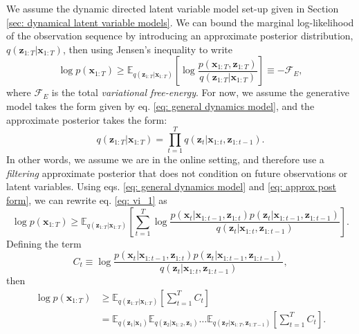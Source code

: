 We assume the dynamic directed latent variable model set-up given in Section \ref{sec: dynamical latent variable models}. We can bound the marginal log-likelihood of the observation sequence by introducing an approximate posterior distribution, $q(\mathbf{z}_{1:T} | \mathbf{x}_{1:T})$, then using Jensen's inequality to write
\begin{equation}
    \log p(\mathbf{x}_{1:T}) \geq \mathbb{E}_{q(\mathbf{z}_{1:T} | \mathbf{x}_{1:T})} \left[ \log \frac{p(\mathbf{x}_{1:T} , \mathbf{z}_{1:T})}{q(\mathbf{z}_{1:T} | \mathbf{x}_{1:T})} \right] \equiv - \mathcal{F}_E,
    \label{eq: vi_1}
\end{equation}
where $\mathcal{F}_E$ is the total \textit{variational free-energy}. For now, we assume the generative model takes the form given by eq. \ref{eq: general dynamics model}, and the approximate posterior takes the form:
\begin{equation}
    q(\mathbf{z}_{1:T} | \mathbf{x}_{1:T}) = \prod_{t=1}^T q(\mathbf{z}_t | \mathbf{x}_{1:t} , \mathbf{z}_{1:t-1}).
    \label{eq: approx post form}
\end{equation}
In other words, we assume we are in the online setting, and therefore use a \textit{filtering} approximate posterior that does not condition on future observations or latent variables. Using eqs. \ref{eq: general dynamics model} and \ref{eq: approx post form}, we can rewrite eq. \ref{eq: vi_1} as
\begin{equation}
    \log p(\mathbf{x}_{1:T}) \geq \mathbb{E}_{q(\mathbf{z}_{1:T} | \mathbf{x}_{1:T})} \left[ \sum_{t=1}^T \log \frac{p(\mathbf{x}_t | \mathbf{x}_{1:t-1} , \mathbf{z}_{1:t}) p(\mathbf{z}_t | \mathbf{x}_{1:t-1} , \mathbf{z}_{1:t-1})}{q(\mathbf{z}_t | \mathbf{x}_{1:t} , \mathbf{z}_{1:t-1})} \right].
\end{equation}
Defining the term
\begin{equation}
    C_t \equiv \log \frac{p(\mathbf{x}_t | \mathbf{x}_{1:t-1} , \mathbf{z}_{1:t}) p(\mathbf{z}_t | \mathbf{x}_{1:t-1} , \mathbf{z}_{1:t-1})}{q(\mathbf{z}_t | \mathbf{x}_{1:t} , \mathbf{z}_{1:t-1})},
\end{equation}
then
\begin{align}
    \log p(\mathbf{x}_{1:T}) & \geq \mathbb{E}_{q(\mathbf{z}_{1:T} | \mathbf{x}_{1:T})} \left[ \sum_{t=1}^T C_t \right] \\
    & = \mathbb{E}_{q(\mathbf{z}_1 | \mathbf{x}_1)} \mathbb{E}_{q(\mathbf{z}_2 | \mathbf{x}_{1:2} , \mathbf{z}_1)} \dots \mathbb{E}_{q(\mathbf{z}_T | \mathbf{x}_{1:T} , \mathbf{z}_{1:T-1})} \left[ \sum_{t=1}^T C_t \right].
\end{align}
